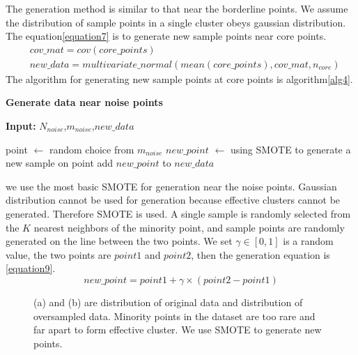 \documentclass[ida]{iosart2x}
\begin{document}
The generation method is similar to that near the borderline points. 
We assume the distribution of sample points in a single cluster obeys gaussian distribution.
The equation\ref{equation7} is to generate new sample points near core points.
\begin{equation}
  \label{equation7}
  \begin{aligned}
    & cov\_mat=cov(core\_points) \\
    & new\_data=multivariate\_normal(mean(core\_points),cov\_mat,n_{core})
  \end{aligned}
\end{equation}
The algorithm for generating new sample points at core points is algorithm\ref{alg4}.

\textbf{Generate data near noise points}
\begin{algorithm}[tb]
  \caption{$generate\_noise$}
  \label{alg5}
  \hspace*{0.02in} {\bf Input:} $N_{noise}$,$m_{noise}$,$new\_data$
  \begin{algorithmic}
    \State point $\leftarrow$ random choice from $m_{noise}$
    \State $new\_point$ $\leftarrow$ using SMOTE to generate a new sample on point
    \State add $new\_point$ to $new\_data$
    \EndFor
  \end{algorithmic}
\end{algorithm}
we use the most basic SMOTE for generation near the noise points.
Gaussian distribution cannot be used for generation because effective clusters cannot be generated. 
Therefore SMOTE is used.
A single sample is randomly selected from the $K$ nearest neighbors of the minority point, 
 and sample points are randomly generated on the line between the two points.
 We set $\gamma \in [0,1]$ is a random value, the two points are $point1$ and $point2$,
 then the generation equation is \ref{equation9}.
 \begin{equation}
  \label{equation9}
  new\_point=point1+\gamma \times (point2-point1)
\end{equation}

\begin{figure}[tb]
  \centering
  \quad
  \caption{(a) and (b) are distribution of original data and distribution of oversampled data.
  Minority points in the dataset are too rare and far apart to form effective cluster. 
  We use SMOTE to generate new points.}
  \label{fig14}
  \end{figure}
\end{document}
